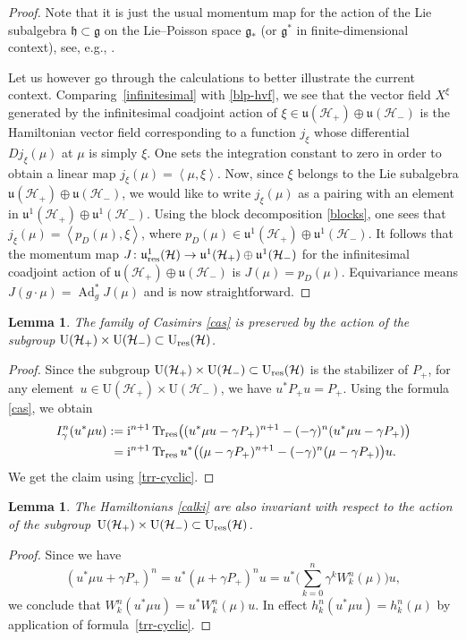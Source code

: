 \documentclass[pdftex]{sigma}
\newtheorem{lem}[thm]{Lemma}
\theoremstyle{definition}
\numberwithin{equation}{section}
\newcommand{\pair}[2]{\left\langle #1 , #2 \right\rangle}
\renewcommand{\H}{\mathcal{H}}
\newcommand{\g}{\mathfrak{g}}
\newcommand{\Up}{\mathrm{U}(\H_+)}\newcommand{\Um}{\mathrm{U}(\H_-)}
\newcommand{\Ur}{\mathrm{U}_{\textnormal{res}}(\H)}
\newcommand{\uup}{\mathfrak u(\H_+)}\newcommand{\uum}{\mathfrak u(\H_-)}
\newcommand{\uujp}{\mathfrak u^1(\H_+)}\newcommand{\uujm}{\mathfrak u^1(\H_-)}
\newcommand{\urp}{\mathfrak u_{\textnormal{res}}^1(\H)}
\DeclareMathOperator{\Trr}{Tr_{res}}
\DeclareMathOperator{\Ad}{Ad}
\begin{document}
\begin{proof}
Note that it is just the usual momentum map for the action of the Lie subalgebra $\mathfrak h\subset \g$ on the Lie--Poisson space $\g_*$ (or $\g^*$ in finite-dimensional context), see, e.g., \cite[Example~11.4.g]{ratiu-ms}.

Let us however go through the calculations to better illustrate the current context.
Comparing~\eqref{infinitesimal} with \eqref{blp-hvf}, we see that the vector field $X^\xi$ generated by the infinitesimal coadjoint action of $\xi\in \uup\oplus\uum$ is the Hamiltonian vector field corresponding to a function $j_\xi$ whose differential $Dj_\xi(\mu)$ at $\mu$ is simply $\xi$. One sets the integration constant to zero in order to obtain a linear map
$ j_\xi(\mu) = \pair\mu\xi$.
Now, since $\xi$ belongs to the Lie subalgebra $\uup\oplus\uum$, we would like to write $j_\xi(\mu)$ as a pairing with an element in $\uujp\oplus\uujm$. Using the block decomposition \eqref{blocks}, one sees that
$ j_\xi(\mu) = \pair{p_D(\mu)}\xi$,
where $p_D(\mu)\in \uujp\oplus\uujm$. It follows that the momentum map $J\colon \urp\rightarrow \uujp\oplus\uujm$ for the infinitesimal coadjoint action of $\uup\oplus\uum$ is
$ J(\mu) = p_D(\mu)$.
Equivariance means
$J(g\cdot\mu) = \Ad^*_g J(\mu)$
and is now straightforward.
\end{proof}


\begin{lem}
The family of Casimirs \eqref{cas} is preserved by the action of the subgroup $\Up\times\Um\subset \Ur$.
\end{lem}
\begin{proof}
Since the subgroup $\Up\times\Um\subset \Ur$ is the stabilizer of $P_+$, for any element~${u\in\Up\times\Um}$, we have $u^* P_+ u = P_+$. Using the formula \eqref{cas}, we obtain
\begin{align*} I^n_\gamma(u^* \mu u):={}&{\rm i}^{n+1}\Trr\bigl( (u^*\mu u-\gamma P_+)^{n+1}-(-\gamma)^{n}(u^*\mu u-\gamma P_+)\bigr)\\
={}&
 {\rm i}^{n+1}\Trr u^*\bigl( (\mu-\gamma P_+)^{n+1}-(-\gamma)^{n}(\mu-\gamma P_+)\bigr)u.\end{align*}
We get the claim using \eqref{trr-cyclic}.
\end{proof}

\begin{lem}
The Hamiltonians \eqref{calki} are also invariant with respect to the action of the subgroup~${\Up\times\Um\subset \Ur}$.
\end{lem}
\begin{proof}
Since we have
\[ (u^* \mu u+\gamma P_+)^n=u^*(\mu +\gamma P_+)^n u=u^*\Biggl(\sum_{k=0}^n\gamma^k W_k^n(\mu)\Biggr)u, \]
we conclude that
$W^n_k(u^*\mu u) = u^* W^n_k(\mu) u$.
In effect $h^n_k(u^*\mu u) = h^n_k(\mu)$ by application of formula~\eqref{trr-cyclic}.
\end{proof}
\end{document}

